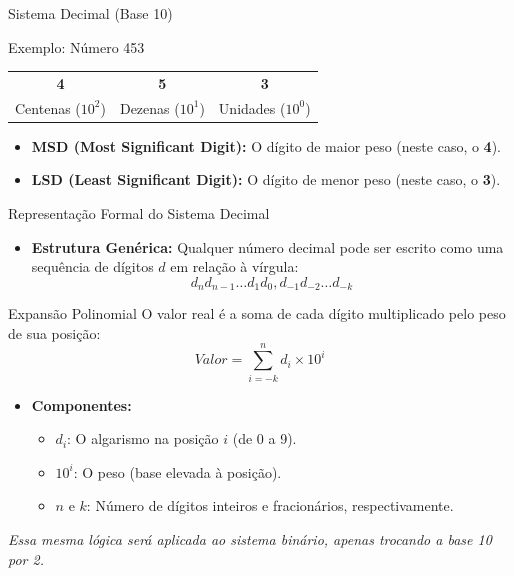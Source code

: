 \begin{frame}{Sistema Decimal (Base 10)}
    \begin{exampleblock}{Exemplo: Número 453}
        \centering
        \begin{tabular}{c c c}
            \textbf{4}        & \textbf{5}       & \textbf{3}        \\
            Centenas ($10^2$) & Dezenas ($10^1$) & Unidades ($10^0$) \\
        \end{tabular}
    \end{exampleblock}

    \begin{itemize}
        \item \textbf{MSD (Most Significant Digit):} O dígito de maior peso (neste caso, o \textbf{4}).
        \item \textbf{LSD (Least Significant Digit):} O dígito de menor peso (neste caso, o \textbf{3}).
    \end{itemize}

\end{frame}

\begin{frame}{Representação Formal do Sistema Decimal}
    \begin{itemize}
        \item \textbf{Estrutura Genérica:} Qualquer número decimal pode ser escrito como uma sequência de dígitos $d$ em relação à vírgula:
              $$d_n d_{n-1} \dots d_1 d_0 , d_{-1} d_{-2} \dots d_{-k}$$
    \end{itemize}

    \begin{block}{Expansão Polinomial}
        O valor real é a soma de cada dígito multiplicado pelo peso de sua posição:
        $$Valor = \sum_{i=-k}^{n} d_i \times 10^i$$
    \end{block}

    \begin{itemize}
        \item \textbf{Componentes:}
              \begin{itemize}
                  \item $d_i$: O algarismo na posição $i$ (de 0 a 9).
                  \item $10^i$: O peso (base elevada à posição).
                  \item $n$ e $k$: Número de dígitos inteiros e fracionários, respectivamente.
              \end{itemize}
    \end{itemize}

    \vspace{0.2cm}
    \centering
    \textit{Essa mesma lógica será aplicada ao sistema binário, apenas trocando a base 10 por 2.}
\end{frame}

